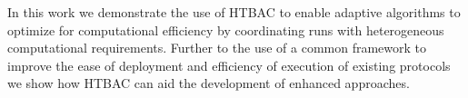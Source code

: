 






In this work we demonstrate the use of HTBAC to enable adaptive  
algorithms to optimize for computational efficiency by coordinating runs with 
heterogeneous computational requirements.
Further to the use of a common framework to improve the ease of deployment and
efficiency of execution of existing protocols we show how HTBAC can aid the
development of enhanced approaches. 


